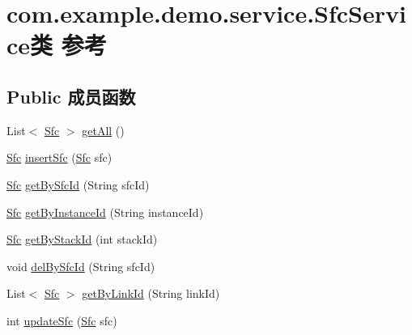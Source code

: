 \hypertarget{classcom_1_1example_1_1demo_1_1service_1_1_sfc_service}{}\section{com.\+example.\+demo.\+service.\+Sfc\+Service类 参考}
\label{classcom_1_1example_1_1demo_1_1service_1_1_sfc_service}
\subsection*{Public 成员函数}
\begin{DoxyCompactItemize}
\item 
List$<$ \mbox{\hyperlink{classcom_1_1example_1_1demo_1_1modular_1_1_sfc}{Sfc}} $>$ \mbox{\hyperlink{classcom_1_1example_1_1demo_1_1service_1_1_sfc_service_a8538aa68dc866b675f7c0d9ce43a7201}{get\+All}} ()
\item 
\mbox{\hyperlink{classcom_1_1example_1_1demo_1_1modular_1_1_sfc}{Sfc}} \mbox{\hyperlink{classcom_1_1example_1_1demo_1_1service_1_1_sfc_service_a8ebb4e1dbee979c86c18f76db58bdc08}{insert\+Sfc}} (\mbox{\hyperlink{classcom_1_1example_1_1demo_1_1modular_1_1_sfc}{Sfc}} sfc)
\item 
\mbox{\hyperlink{classcom_1_1example_1_1demo_1_1modular_1_1_sfc}{Sfc}} \mbox{\hyperlink{classcom_1_1example_1_1demo_1_1service_1_1_sfc_service_a488425730447275b6f7bcbfdeb4f8724}{get\+By\+Sfc\+Id}} (String sfc\+Id)
\item 
\mbox{\hyperlink{classcom_1_1example_1_1demo_1_1modular_1_1_sfc}{Sfc}} \mbox{\hyperlink{classcom_1_1example_1_1demo_1_1service_1_1_sfc_service_a2d5ede25432957ec4d9ba02d6c32f4c6}{get\+By\+Instance\+Id}} (String instance\+Id)
\item 
\mbox{\hyperlink{classcom_1_1example_1_1demo_1_1modular_1_1_sfc}{Sfc}} \mbox{\hyperlink{classcom_1_1example_1_1demo_1_1service_1_1_sfc_service_a8f4c61c620524840b0a272fff71ea418}{get\+By\+Stack\+Id}} (int stack\+Id)
\item 
void \mbox{\hyperlink{classcom_1_1example_1_1demo_1_1service_1_1_sfc_service_a2fd6dc8d65c2e3ed6a662bdc04056bcc}{del\+By\+Sfc\+Id}} (String sfc\+Id)
\item 
List$<$ \mbox{\hyperlink{classcom_1_1example_1_1demo_1_1modular_1_1_sfc}{Sfc}} $>$ \mbox{\hyperlink{classcom_1_1example_1_1demo_1_1service_1_1_sfc_service_a0d7a3f38c65198038d609b3bdf209a5e}{get\+By\+Link\+Id}} (String link\+Id)
\item 
int \mbox{\hyperlink{classcom_1_1example_1_1demo_1_1service_1_1_sfc_service_a5c5158d1bc2842e9d9d4f3c9e08e2a5c}{update\+Sfc}} (\mbox{\hyperlink{classcom_1_1example_1_1demo_1_1modular_1_1_sfc}{Sfc}} sfc)
\end{DoxyCompactItemize}
